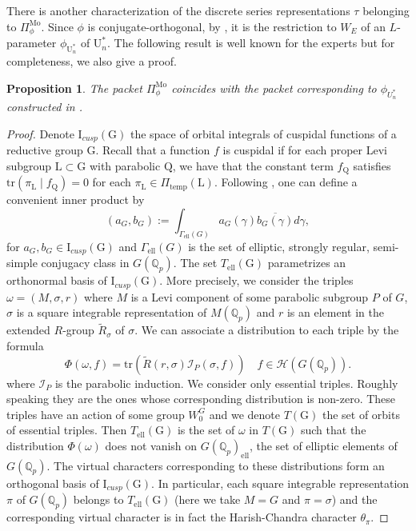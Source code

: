\documentclass[reqno,11pt]{amsart}
\newtheorem{proposition}[theorem]{Proposition}
\theoremstyle{remark}
\newcommand{\G}{\mathrm{G}}
\newcommand{\U}{\mathrm{U}}
\newcommand{\tr}{\mathrm{tr}}
\newcommand{\Q}{\mathbb{Q}}
\newcommand{\temp}{\mathrm{temp}}
\newcommand{\I}{\mathrm{I}}
\begin{document}
There is another characterization of the discrete series representations $\tau$ belonging to $\Pi^{\mathrm{Mo}}_{\phi}$. Since $\phi$ is conjugate-orthogonal, by \cite[Theorem 8.1 (ii)]{GGP}, it is the restriction to $W_E$ of an $L$-parameter $\phi_{\U^*_n}$ of $\U^*_n$. The following result is well known for the experts but for completeness, we also give a proof.

\begin{proposition}{\label{Moeglinpacket}}
The packet $\Pi^{\mathrm{Mo}}_{\phi}$ coincides with the packet corresponding to $\phi_{U^*_n}$ constructed in \cite{Mok}.
\end{proposition}
\begin{proof}
Denote $ \I_{cusp} (\G) $ the space of orbital integrals of cuspidal functions of a reductive group $\G$. Recall that a function $f$ is cuspidal if for each proper Levi subgroup $\mathrm{L} \subset \G$ with parabolic $\mathrm{Q}$, we have that the constant term $f_{\mathrm{Q}}$ satisfies $\tr(\pi_{\mathrm{L}} \mid f_{\mathrm{Q}})=0$ for each $\pi_{\mathrm{L}} \in \Pi_{\temp}(\mathrm{L})$. Following \cite[\S6]{Art93} \cite[\S1]{Art96}, one can define a convenient inner product by
\[
(a_G, b_G) := \int_{\Gamma_{\mathrm{ell}}(G)} a_G(\gamma) \overline{b_G(\gamma)} d\gamma,
\]
for $a_G, b_G \in \I_{cusp}(\G)$ and $\Gamma_{\mathrm{ell}}(G)$ is the set of elliptic, strongly regular, semi-simple conjugacy class in $G(\Q_p)$. The set $T_{\mathrm{ell}}(\G)$ parametrizes an orthonormal basis of $\I_{cusp}(\G)$. More precisely, we consider the triples $ \omega = (M, \sigma, r)$ where $M$ is a Levi component of some parabolic subgroup $P$ of $G$, $\sigma$ is a square integrable representation of $M(\Q_p)$ and $r$ is an element in the extended $R$-group $\widetilde{R}_{\sigma}$ of $\sigma$. We can associate a distribution to each triple by the formula
\[
\Phi(\omega, f) = \tr(\widetilde{R}(r, \sigma)\mathcal{I}_P(\sigma, f)) \quad f \in \mathcal{H}(G(\Q_p)).  
\]
where $\mathcal{I}_P$ is the parabolic induction. We consider only essential triples. Roughly speaking they are the ones whose corresponding distribution is non-zero. These triples have an action of some group $W_0^G$ and we denote $T(\G)$ the set of orbits of essential triples. Then $T_{\mathrm{ell}}(\G)$ is the set of $\omega$ in $T(\G)$ such that the distribution $\Phi(\omega)$ does not vanish on $G(\Q_p)_{\mathrm{ell}}$, the set of elliptic elements of $G(\Q_{p})$. The virtual characters corresponding to these distributions form an orthogonal basis of $\I_{cusp}(\G)$. In particular, each square integrable representation $\pi$ of $G(\Q_p)$ belongs to $T_{\mathrm{ell}}(\G)$ (here we take $M = G$ and $\pi = \sigma$) and the corresponding virtual character is in fact the Harish-Chandra character $\theta_{\pi}$. 


\end{proof}
\end{document}
